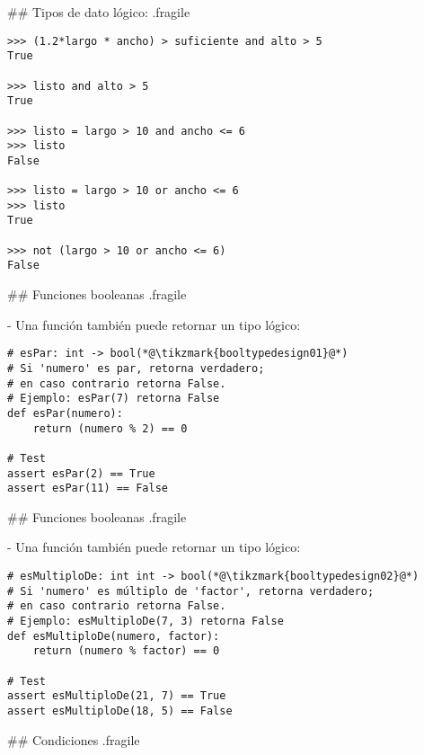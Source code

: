 \trmcolumns


## Tipos de dato lógico: {.fragile}


\begin{lstlisting}
>>> (1.2*largo * ancho) > suficiente and alto > 5
True

>>> listo and alto > 5
True

>>> listo = largo > 10 and ancho <= 6
>>> listo
False

>>> listo = largo > 10 or ancho <= 6
>>> listo
True

>>> not (largo > 10 or ancho <= 6)
False
\end{lstlisting}

## Funciones booleanas {.fragile}

- Una función también puede retornar un tipo lógico:

\begin{lstlisting}
# esPar: int -> bool(*@\tikzmark{booltypedesign01}@*)
# Si 'numero' es par, retorna verdadero;
# en caso contrario retorna False.
# Ejemplo: esPar(7) retorna False
def esPar(numero):
    return (numero % 2) == 0

# Test
assert esPar(2) == True
assert esPar(11) == False
\end{lstlisting}

\pause


## Funciones booleanas {.fragile}

- Una función también puede retornar un tipo lógico:

\begin{lstlisting}
# esMultiploDe: int int -> bool(*@\tikzmark{booltypedesign02}@*)
# Si 'numero' es múltiplo de 'factor', retorna verdadero;
# en caso contrario retorna False.
# Ejemplo: esMultiploDe(7, 3) retorna False
def esMultiploDe(numero, factor):
    return (numero % factor) == 0

# Test
assert esMultiploDe(21, 7) == True
assert esMultiploDe(18, 5) == False
\end{lstlisting}

## Condiciones {.fragile}

